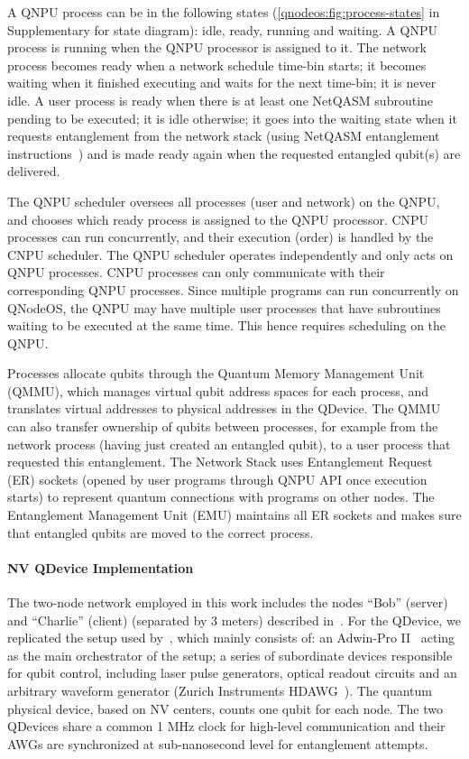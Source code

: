A QNPU process can be in the following states (\cref{qnodeos:fig:process-states} in Supplementary for state diagram): idle, ready, running and waiting. A QNPU process is running when the QNPU processor is assigned to it. The network process becomes ready when a network schedule time-bin starts; it becomes waiting when it finished executing and waits for the next time-bin; it is never idle. A user process is ready when there is at least one NetQASM subroutine pending to be executed; it is idle otherwise; it goes into the waiting state when it requests entanglement from the network stack (using NetQASM entanglement instructions~\cite{dahlberg_2022_netqasm}) and is made ready again when the requested entangled qubit(s) are delivered. 

The QNPU scheduler oversees all processes (user and network) on the QNPU, and chooses which ready process is assigned to the QNPU processor. CNPU processes can run concurrently, and their execution (order) is handled by the CNPU scheduler. The QNPU scheduler operates independently and only acts on QNPU processes. CNPU processes can only communicate with their corresponding QNPU processes. Since multiple programs can run concurrently on QNodeOS, the QNPU may have multiple user processes that have subroutines waiting to be executed at the same time. This hence requires scheduling on the QNPU.

Processes allocate qubits through the Quantum Memory Management Unit (QMMU), which manages virtual qubit address spaces for each process, and translates virtual addresses to physical addresses in the QDevice. The QMMU can also transfer ownership of qubits between processes, for example from the network process (having just created an entangled qubit), to a user process that requested this entanglement. The Network Stack uses Entanglement Request (ER) sockets (opened by user programs through QNPU API once execution starts) to represent quantum connections with programs on other nodes. The Entanglement Management Unit (EMU) maintains all ER sockets and makes sure that entangled qubits are moved to the correct process.

\paragraph{NV QDevice Implementation}

The two-node network employed in this work includes the nodes “Bob” (server) and “Charlie” (client) (separated by 3 meters) described in~\cite{pompili_2021_multinode,hermans2022qubit,pompili_2022_experimental}. For the QDevice, we replicated the setup used by~\cite{pompili_2022_experimental}, which mainly consists of: an Adwin-Pro II~\cite{adwin} acting as the main orchestrator of the setup; a series of subordinate devices responsible for qubit control, including laser pulse generators, optical readout circuits and an arbitrary waveform generator (Zurich Instruments HDAWG~\cite{zurich_instruments_hdawg_2019}). The quantum physical device, based on NV centers, counts one qubit for each node. The two QDevices share a common 1 MHz clock for high-level communication and their AWGs are synchronized at sub-nanosecond level for entanglement attempts.

